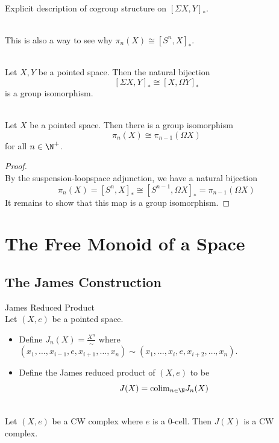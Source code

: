 \documentclass[a4paper]{article}
\begin{document}
\begin{eg}{}{}\\
Explicit description of cogroup structure on $[\Sigma X,Y]_\ast$. 
\end{eg}

\begin{eg}{}{}\\
This is also a way to see why $\pi_n(X)\cong[S^n,X]_\ast$. 
\end{eg}

\begin{prp}{}{}\\
Let $X,Y$ be a pointed space. Then the natural bijection $$[\Sigma X,Y]_\ast\cong[X,\Omega Y]_\ast$$ is a group isomorphism. 
\end{prp}

\begin{prp}{}{}\\
Let $X$ be a pointed space. Then there is a group isomorphism $$\pi_n(X)\cong\pi_{n-1}(\Omega X)$$ for all $n\in\N^+$. 
\begin{proof}\\
By the suspension-loopspace adjunction, we have a natural bijection $$\pi_n(X)=[S^n,X]_\ast\cong[S^{n-1},\Omega X]_\ast=\pi_{n-1}(\Omega X)$$ It remains to show that this map is a group isomorphism. 
\end{proof}
\end{prp}

\pagebreak
\section{The Free Monoid of a Space}
\subsection{The James Construction}
\begin{defn}{James Reduced Product}{}\\
Let $(X,e)$ be a pointed space. 
\begin{itemize}
\item Define $J_n(X)=\frac{X^n}{\sim}$ where $(x_1,\dots,x_{i-1},e,x_{i+1},\dots,x_n)\sim(x_1,\dots,x_i,e,x_{i+2},\dots,x_n)$. 
\item Define the James reduced product of $(X,e)$ to be $$J(X)=\text{colim}_{n\in\N}J_n(X)$$
\end{itemize}
\end{defn}

\begin{lmm}{}{}\\
Let $(X,e)$ be a CW complex where $e$ is a $0$-cell. Then $J(X)$ is a CW complex. 
\end{lmm}
\end{document}
